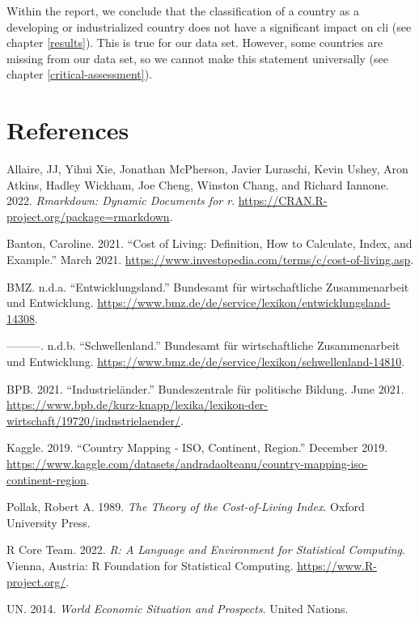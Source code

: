 \documentclass[
  11pt,
  a4paper,
  twoside]{scrbook}
\newlength{\cslhangindent}
\newlength{\cslentryspacingunit} %
\newenvironment{CSLReferences}[2] %
 {%
  \setlength{\parindent}{0pt}
  \ifodd #1
  \let\oldpar\par
  \def\par{\hangindent=\cslhangindent\oldpar}
  \fi
    \setlength{\parskip}{#2\cslentryspacingunit+5pt}
   }%
 {}
\begin{document}
Within the report, we conclude that the classification of a country as a developing or industrialized country does not have a significant impact on cli (see chapter \ref{results}). This is true for our data set. However, some countries are missing from our data set, so we cannot make this statement universally (see chapter \ref{critical-assessment}).

\pagebreak

\hypertarget{references}{%
\chapter*{References}\label{references}}

\hypertarget{refs}{}
\begin{CSLReferences}{1}{0}
\leavevmode{}%
Allaire, JJ, Yihui Xie, Jonathan McPherson, Javier Luraschi, Kevin Ushey, Aron Atkins, Hadley Wickham, Joe Cheng, Winston Chang, and Richard Iannone. 2022. \emph{Rmarkdown: Dynamic Documents for r}. \url{https://CRAN.R-project.org/package=rmarkdown}.

\leavevmode{}%
Banton, Caroline. 2021. {``Cost of Living: Definition, How to Calculate, Index, and Example.''} March 2021. \url{https://www.investopedia.com/terms/c/cost-of-living.asp}.

\leavevmode{}%
BMZ. n.d.a. {``Entwicklungsland.''} Bundesamt für wirtschaftliche Zusammenarbeit und Entwicklung. \url{https://www.bmz.de/de/service/lexikon/entwicklungsland-14308}.

\leavevmode{}%
---------. n.d.b. {``Schwellenland.''} Bundesamt für wirtschaftliche Zusammenarbeit und Entwicklung. \url{https://www.bmz.de/de/service/lexikon/schwellenland-14810}.

\leavevmode{}%
BPB. 2021. {``Industrieländer.''} Bundeszentrale für politische Bildung. June 2021. \url{https://www.bpb.de/kurz-knapp/lexika/lexikon-der-wirtschaft/19720/industrielaender/}.

\leavevmode{}%
Kaggle. 2019. {``Country Mapping - ISO, Continent, Region.''} December 2019. \url{https://www.kaggle.com/datasets/andradaolteanu/country-mapping-iso-continent-region}.

\leavevmode{}%
Pollak, Robert A. 1989. \emph{The Theory of the Cost-of-Living Index}. Oxford University Press.

\leavevmode{}%
R Core Team. 2022. \emph{R: A Language and Environment for Statistical Computing}. Vienna, Austria: R Foundation for Statistical Computing. \url{https://www.R-project.org/}.

\leavevmode{}%
UN. 2014. \emph{World Economic Situation and Prospects}. United Nations.

\end{CSLReferences}
\end{document}
